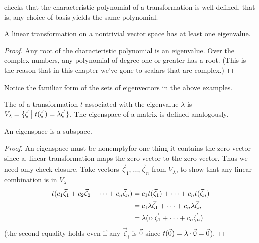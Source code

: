 \noindent {} checks that the 
characteristic polynomial of a transformation is 
well-defined, that is, any choice of basis yields the same polynomial.

\begin{lemma} \label{le:MapNonTrivSpHasEigen}
A linear transformation on a nontrivial vector space has at least one
eigenvalue.
\end{lemma}

\begin{proof}
Any root of the characteristic polynomial is an eigenvalue.
Over the complex numbers, any polynomial of degree one or greater
has a root.
(This is the reason that in this chapter 
we've gone to scalars that are complex.)
\end{proof}

Notice the familiar form of the sets of eigenvectors in the above examples.

\begin{definition}
The 
of a transformation \( t \) associated with the
eigenvalue \( \lambda \) is
$
  V_\lambda=\mbox{$\{\vec{\zeta}\bigm| t(\vec{\zeta}\,)=\lambda\vec{\zeta}\,\}$}
$.
The eigenspace of a matrix is defined analogously.
\end{definition}

\begin{lemma}  \label{le:EigSpaceIsSubSp}
An eigenspace is a subspace.
\end{lemma}
\begin{proof}
An eigenspace must be nonempty\Dash for one thing it contains the zero
vector since a. linear transformation maps the zero vector to the 
zero vector. 
Thus we need only check closure.
Take vectors \( \vec{\zeta}_1,\ldots,\vec{\zeta}_n \) from \( V_\lambda \),
to show that any linear combination is in \( V_\lambda \)
\begin{align*}
  t(c_1\vec{\zeta}_1+c_2\vec{\zeta}_2+\cdots +c_n\vec{\zeta}_n)
  &=c_1t(\vec{\zeta}_1)+\dots+c_nt(\vec{\zeta}_n)               \\
  &=c_1\lambda\vec{\zeta}_1+\dots+c_n\lambda\vec{\zeta}_n          \\
  &=\lambda(c_1\vec{\zeta}_1+\dots+c_n\vec{\zeta}_n)
\end{align*}
(the second equality holds even if any \( \vec{\zeta}_i \) is \( \vec{0} \) since
\( t(\vec{0})=\lambda\cdot\vec{0}=\vec{0} \)).
\end{proof}

